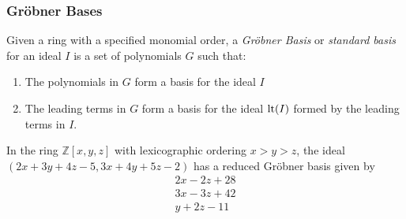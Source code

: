 \documentclass{beamer}
\begin{document}

\begin{frame}
\frametitle{Gr\"obner Bases}
\begin{definition}
Given a ring with a specified monomial order,
a {\it Gr\"obner Basis} or {\it standard basis} for an ideal $I$ is a set of
polynomials $G$ such that:
\begin{enumerate}
\item The polynomials in $G$ form a basis for the ideal $I$
\item The leading terms in $G$ form a basis for the ideal ${\rm lt}(I)$ formed by the leading terms in $I$.
\end{enumerate}
\end{definition}

\begin{example}
In the ring ${\mathbb Z}[x,y,z]$ with lexicographic ordering $x>y>z$, the ideal $(2x+3y+4z-5, 3x+4y+5z-2)$
has a reduced Gr\"obner basis given by
\begin{align*}
2x-2z+28 \\
3x-3z+42 \\
y+2z-11
\end{align*}
\end{example}
\end{frame}
\end{document}
